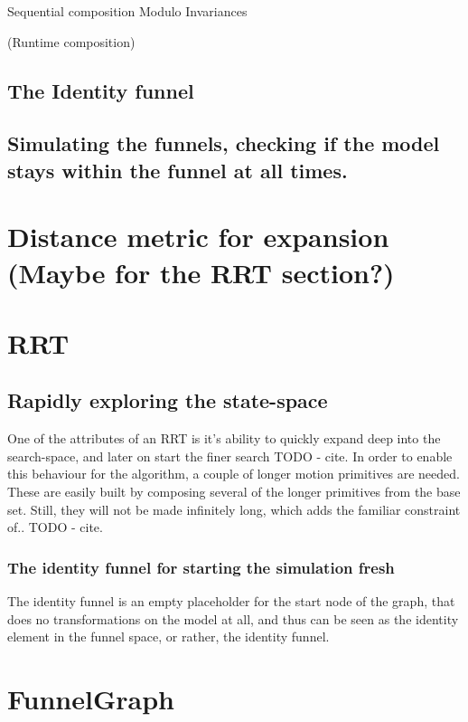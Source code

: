 Sequential composition Modulo Invariances

(Runtime composition)

\subsection{The Identity funnel}

\subsection{Simulating the funnels, checking if the model stays within the
  funnel at all times.}

\section{Distance metric for expansion (Maybe for the RRT section?)}

\section{RRT}

\subsection{Rapidly exploring the state-space}

One of the attributes of an \ac{RRT} is it's ability to quickly expand deep into
the search-space, and later on start the finer search TODO - cite. In order to
enable this behaviour for the \rrtfunnel{} algorithm, a couple of longer motion
primitives are needed. These are easily built by composing several of the longer
primitives from the base set. Still, they will not be made infinitely long,
which adds the familiar constraint of.. TODO - cite.

\subsubsection{The identity funnel for starting the simulation fresh}

The identity funnel is an empty placeholder for the start node of the graph,
that does no transformations on the model at all, and thus can be seen as the
identity element in the funnel space, or rather, the identity funnel.

\section{FunnelGraph}

